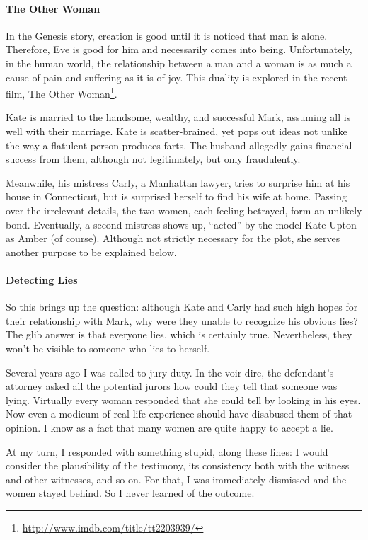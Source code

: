 \paragraph{The Other Woman}


In the Genesis story, creation is good until it is noticed that man is alone. Therefore, Eve is good for him and necessarily comes into being. Unfortunately, in the human world, the relationship between a man and a woman is as much a cause of pain and suffering as it is of joy. This duality is explored in the recent film, The Other Woman\footnote{\url{http://www.imdb.com/title/tt2203939/}}.

Kate is married to the handsome, wealthy, and successful Mark, assuming all is well with their marriage. Kate is scatter-brained, yet pops out ideas not unlike the way a flatulent person produces farts. The husband allegedly gains financial success from them, although not legitimately, but only fraudulently.

Meanwhile, his mistress Carly, a Manhattan lawyer, tries to surprise him at his house in Connecticut, but is surprised herself to find his wife at home. Passing over the irrelevant details, the two women, each feeling betrayed, form an unlikely bond. Eventually, a second mistress shows up, ``acted'' by the model Kate Upton as Amber (of course). Although not strictly necessary for the plot, she serves another purpose to be explained below.

\paragraph{Detecting Lies}


So this brings up the question: although Kate and Carly had such high hopes for their relationship with Mark, why were they unable to recognize his obvious lies? The glib answer is that everyone lies, which is certainly true. Nevertheless, they won't be visible to someone who lies to herself.

Several years ago I was called to jury duty. In the voir dire, the defendant's attorney asked all the potential jurors how could they tell that someone was lying. Virtually every woman responded that she could tell by looking in his eyes. Now even a modicum of real life experience should have disabused them of that opinion. I know as a fact that many women are quite happy to accept a lie.

At my turn, I responded with something stupid, along these lines: I would consider the plausibility of the testimony, its consistency both with the witness and other witnesses, and so on. For that, I was immediately dismissed and the women stayed behind. So I never learned of the outcome.

